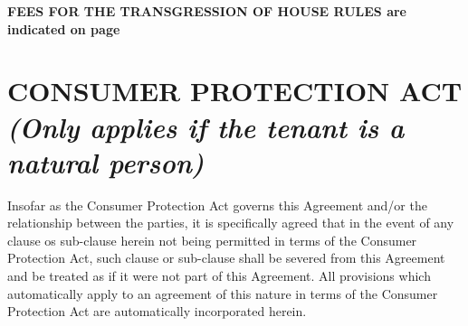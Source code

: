 \documentclass[11pt]{article}
\begin{document}
\textbf{FEES FOR THE TRANSGRESSION OF HOUSE RULES are indicated on page~\pageref{input:house-rule-fees}}

\section{\uppercase{consumer protection act} \textit{(Only applies if the tenant is a natural person)}}
\label{sec:consumer-protection-act}


Insofar as the Consumer Protection Act governs this Agreement and/or the relationship between the parties, it is specifically agreed that in the event of any clause os sub-clause herein not being permitted in terms of the Consumer Protection Act, such clause or sub-clause shall be severed from this Agreement and be treated as if it were not part of this Agreement. All provisions which automatically apply to an agreement of this nature in terms of the Consumer Protection Act are automatically incorporated herein.
\end{document}
